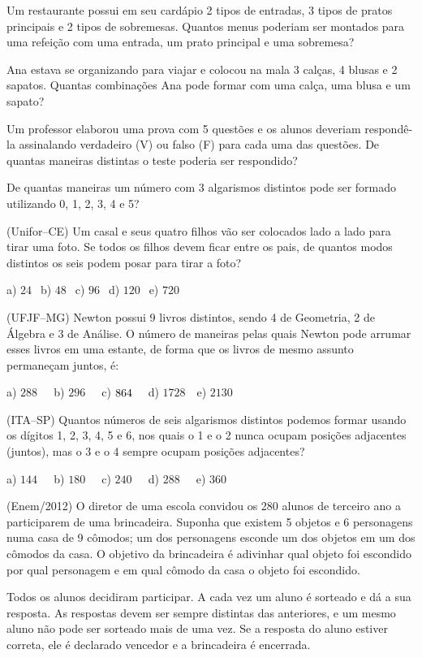 \begin{multicols*}{2}
		\execnum Um restaurante possui em seu cardápio 2 tipos de entradas, 3 tipos de pratos principais e 2 tipos de sobremesas. Quantos menus poderiam ser montados para uma refeição com uma entrada, um prato principal e uma sobremesa?

		\execnum Ana estava se organizando para viajar e colocou na mala 3 calças, 4 blusas e 2 sapatos. Quantas combinações Ana pode formar com uma calça, uma blusa e um sapato?

		\execnum Um professor elaborou uma prova com 5 questões e os alunos deveriam respondê-la assinalando verdadeiro (V) ou falso (F) para cada uma das questões. De quantas maneiras distintas o teste poderia ser respondido?

		\execnum De quantas maneiras um número com 3 algarismos distintos pode ser formado utilizando 0, 1, 2, 3, 4 e 5?

		\execnum (Unifor–CE) Um casal e seus quatro filhos vão ser colocados lado a lado para tirar uma foto. Se todos os filhos devem ficar entre os pais, de quantos modos distintos os seis podem posar para tirar a foto?

		      a) $24 \ \ $ b) $48 \ \ $ c) $96 \ \ $ d) $120 \ \ $ e) $720 \ \ $

		\execnum (UFJF–MG) Newton possui 9 livros distintos, sendo 4 de Geometria, 2 de Álgebra e 3 de Análise. O número de maneiras pelas quais Newton pode arrumar esses livros em uma estante, de forma que os livros de mesmo assunto permaneçam juntos, é:

		      a) $288 \ \ \ \ \ $ b) $296 \ \ \ \ \ $ c) $864 \ \ \ \ \\ $ d) $1728 \ \ \ $ e) $2130 \ \ $

		\execnum (ITA–SP) Quantos números de seis algarismos distintos podemos formar usando os dígitos 1, 2, 3, 4, 5 e 6, nos quais o 1 e o 2 nunca ocupam posições adjacentes (juntos), mas o 3 e o 4 sempre ocupam posições adjacentes?

		      a) $144 \ \ \ \ \ $ b) $180 \ \ \ \ \ $ c) $240 \ \ \ \ \ $ d) $288 \ \ \ \ \ $ e) $360 \ \ $

		\execnum (Enem/2012) O diretor de uma escola convidou os 280 alunos de terceiro ano a participarem de uma brincadeira. Suponha que existem 5 objetos e 6 personagens numa casa de 9 cômodos; um dos personagens esconde um dos objetos em um dos cômodos da casa. O objetivo da brincadeira é adivinhar qual objeto foi escondido por qual personagem e em qual cômodo da casa o objeto foi escondido.

		      Todos os alunos decidiram participar. A cada vez um aluno é sorteado e dá a sua resposta. As respostas devem ser sempre distintas das anteriores, e um mesmo aluno não pode ser sorteado mais de uma vez. Se a resposta do aluno estiver correta, ele é declarado vencedor e a brincadeira é encerrada.


\end{multicols*}
